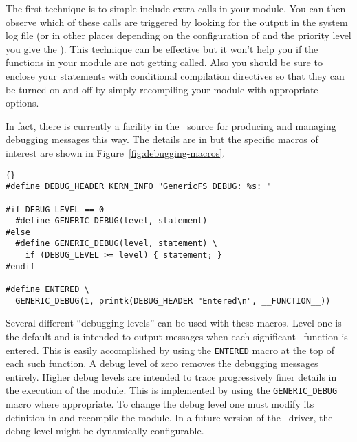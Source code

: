 The first technique is to simple include extra  calls in your module. You can then
observe which of these calls are triggered by looking for the output in the system log file (or
in other places depending on the configuration of  and the priority level you
give the ). This technique can be effective but it won't help you if the functions
in your module are not getting called. Also you should be sure to enclose your 
statements with conditional compilation directives so that they can be turned on and off by
simply recompiling your module with appropriate options.

In fact, there is currently a facility in the \GenericFS\ source for producing and managing
debugging messages this way. The details are in  but the specific macros of
interest are shown in Figure~\ref{fig:debugging-macros}.

\begin{figure*}[htbp]
  \centering
  \begin{wbigbox}
\begin{lstlisting}{}
#define DEBUG_HEADER KERN_INFO "GenericFS DEBUG: %s: "

#if DEBUG_LEVEL == 0
  #define GENERIC_DEBUG(level, statement)
#else
  #define GENERIC_DEBUG(level, statement) \
    if (DEBUG_LEVEL >= level) { statement; }
#endif

#define ENTERED \
  GENERIC_DEBUG(1, printk(DEBUG_HEADER "Entered\n", __FUNCTION__))
\end{lstlisting}
  \end{wbigbox}
  \caption{\GenericFS\ Debugging Macros (in )}
  \label{fig:debugging-macros}
\end{figure*}

Several different ``debugging levels'' can be used with these macros. Level one is the default
and is intended to output messages when each significant \GenericFS\ function is entered. This
is easily accomplished by using the \texttt{ENTERED} macro at the top of each such function. A
debug level of zero removes the debugging messages entirely. Higher debug levels are intended to
trace progressively finer details in the execution of the module. This is implemented by using
the \texttt{GENERIC\-\_DEBUG} macro where appropriate. To change the debug level one must modify
its definition in \filename{global.h} and recompile the module. In a future version of the
\GenericFS\ driver, the debug level might be dynamically configurable.

